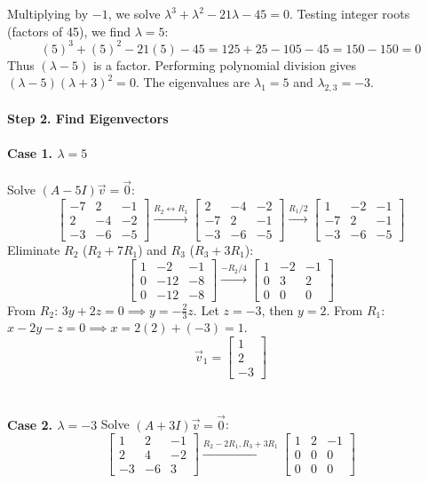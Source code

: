 \documentclass{article}
\begin{document}
Multiplying by $-1$, we solve $\lambda^3 + \lambda^2 - 21\lambda - 45 = 0$.
Testing integer roots (factors of 45), we find $\lambda = 5$:
\[
	(5)^3 + (5)^2 - 21(5) - 45 = 125 + 25 - 105 - 45 = 150 - 150 = 0
\]
Thus $(\lambda - 5)$ is a factor. Performing polynomial division gives
$(\lambda - 5)(\lambda + 3)^{2} = 0$. The eigenvalues are $\lambda_{1} = 5$ and
$\lambda_{2,3} = -3$.
\\
\\
\textbf{Step 2. Find Eigenvectors}
\\
\\
\textbf{Case 1. $\lambda = 5$}
\\
\\
Solve $(A - 5I)\vec{v} = \vec{0}$:
\[
	\begin{bmatrix} -7 & 2 & -1 \\ 2 & -4 & -2 \\ -3 & -6 & -5 \end{bmatrix} \xrightarrow{R_2 \leftrightarrow R_1}
	\begin{bmatrix} 2 & -4 & -2 \\ -7 & 2 & -1 \\ -3 & -6 & -5 \end{bmatrix} \xrightarrow{R_1/2}
	\begin{bmatrix} 1 & -2 & -1 \\ -7 & 2 & -1 \\ -3 & -6 & -5 \end{bmatrix}
\]
Eliminate $R_2$ ($R_2 + 7R_1$) and $R_3$ ($R_3 + 3R_1$):
\[
	\begin{bmatrix} 1 & -2 & -1 \\ 0 & -12 & -8 \\ 0 & -12 & -8 \end{bmatrix} \xrightarrow{-R_2/4}
	\begin{bmatrix} 1 & -2 & -1 \\ 0 & 3 & 2 \\ 0 & 0 & 0 \end{bmatrix}
\]
From $R_2$: $3y + 2z = 0 \implies y = -\frac{2}{3}z$. Let $z = -3$, then $y = 2$.
From $R_1$: $x - 2y - z = 0 \implies x = 2(2) + (-3) = 1$.
\[
	\vec{v}_1 = \begin{bmatrix} 1 \\ 2 \\ -3 \end{bmatrix}
\]
\\
\\
\textbf{Case 2. $\lambda = -3$}
Solve $(A + 3I)\vec{v} = \vec{0}$:
\[
	\begin{bmatrix} 1 & 2 & -1 \\ 2 & 4 & -2 \\ -3 & -6 & 3 \end{bmatrix} \xrightarrow{R_2 - 2R_1, R_3 + 3R_1}
	\begin{bmatrix} 1 & 2 & -1 \\ 0 & 0 & 0 \\ 0 & 0 & 0 \end{bmatrix}
\]
\end{document}
